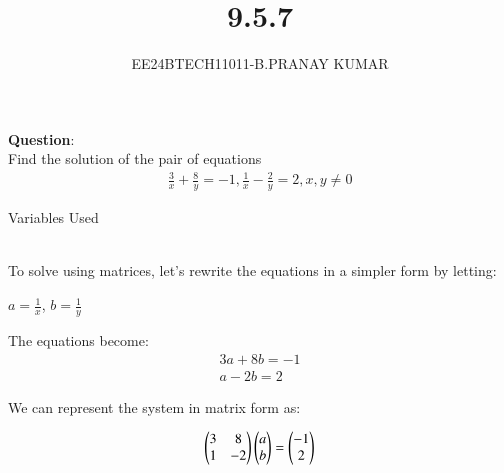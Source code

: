 \documentclass[journal]{IEEEtran}
\begin{document}

\vspace{3cm}

\title{9.5.7}
\author{EE24BTECH11011-B.PRANAY KUMAR
}
 \maketitle
{\let\newpage\relax\maketitle}

\renewcommand{\thefigure}{\theenumi}
\renewcommand{\thetable}{\theenumi}
\setlength{\intextsep}{10pt} %


\renewcommand{\thetable}{\theenumi}



\textbf{Question}:\\
Find the solution of the pair of equations 
\begin{align}
    \frac{3}{x}+\frac{8}{y}= -1 , \frac{1}{x} - \frac{2}{y}= 2 , x,y \neq 0
\end{align}

\solution
\begin{table}[h!]    
  \centering
  
  \caption{Variables Used}
  \label{table 9.5.7}
\end{table}\\
To solve using matrices, let's rewrite the equations in a simpler form by letting:


$a = \frac{1}{x}$, $ b = \frac{1}{y}$


The equations become:
\begin{align}
3a + 8b = -1\\
a - 2b = 2
\end{align}

We can represent the system in matrix form as:

\begin{align}
\begin{pmatrix}3 & 8 \\ 1 & -2 \end{pmatrix} \begin{pmatrix}a \\ b \end{pmatrix} = \begin{pmatrix}-1 \\ 2 \end{pmatrix}
\end{align}
\end{document}
